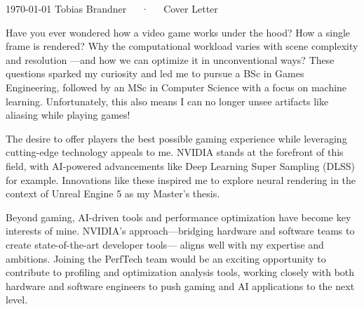 \documentclass[11pt, a4paper]{awesome-cv}
\begin{document}
\makecvheader[R]

\makecvfooter
  {\today}
  {Tobias Brandner~~~·~~~Cover Letter}
  {}

\makelettertitle

\begin{cvletter}

Have you ever wondered how a video game works under the hood? 
How a single frame is rendered?  
 Why the computational workload varies with scene complexity and resolution
 —and how we can optimize it in unconventional ways? 
 These questions sparked my curiosity and led me to pursue a BSc in Games Engineering, 
 followed by an MSc in Computer Science with a focus on machine learning. 
 Unfortunately, this also means I can no longer unsee artifacts like aliasing while playing games!

The desire to offer players the best possible gaming experience while leveraging cutting-edge technology appeals to me. 
NVIDIA stands at the forefront of this field, 
with AI-powered advancements like Deep Learning Super Sampling (DLSS) for example. 
Innovations like these inspired me to explore neural rendering in the context of Unreal Engine 5 as my Master's thesis.

Beyond gaming, AI-driven tools and performance optimization have become key interests of mine. 
NVIDIA’s approach—bridging hardware and software teams to create state-of-the-art developer tools—
aligns well with my expertise and ambitions. 
Joining the PerfTech team would be an exciting opportunity to contribute to profiling and optimization 
analysis tools, working closely with both hardware and software engineers to 
push gaming and AI applications to the next level.




\end{cvletter}
\end{document}
